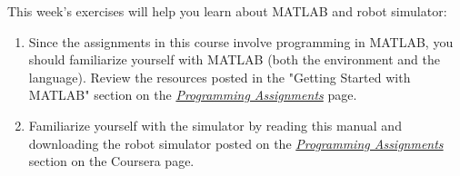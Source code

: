 \documentclass[10pt]{article}
\begin{document}
This week's exercises will help you learn about MATLAB and robot simulator:

\begin{enumerate}
\item Since the assignments in this course involve programming in MATLAB, you should familiarize yourself with MATLAB (both the environment and the language). Review the resources posted in the "Getting Started with MATLAB" section on the \href{https://class.coursera.org/conrob-002/wiki/ProgrammingAssignments}{\textit{Programming Assignments}} page.

\item Familiarize yourself with the simulator by reading this manual and downloading the robot simulator posted on the \href{https://class.coursera.org/conrob-002/wiki/ProgrammingAssignments}{\textit{Programming Assignments}} section on the Coursera page.
\end{enumerate}
\end{document}

